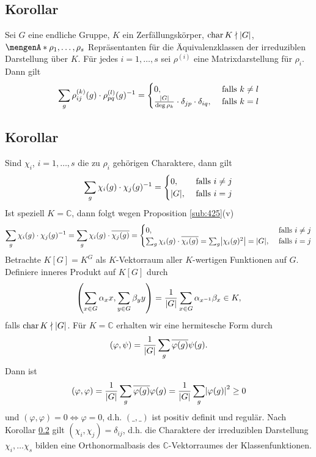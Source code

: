 \subsection{Korollar} %
\label{sub:428}
Sei $G$ eine endliche Gruppe, $K$ ein Zerfällungskörper, $\Char K  \nmid \abs*{G}$, $\set{\rho_1, \ldots , \rho_s}$ Repräsentanten für die Äquivalenzklassen der 
irreduziblen Darstellung über $K$. Für jedes $i=1, \ldots , s$ sei $\rho^{(i)}$ eine Matrixdarstellung für $\rho_i$. Dann gilt 
\[
	\sum_g \rho_{ij}^{(k)}(g) \cdot \rho_{pq}^{(l)}(g) ^{-1} = \begin{cases}
		0, &\text{ falls }k \not= l\\
		\frac{\abs*{G} }{\deg \rho_k} \cdot \delta_{jp} \cdot \delta_{iq} , &\text{ falls } k=l 
	\end{cases}
\]

\subsection{Korollar} %
\label{sub:429}
Sind $\chi_i$, $i=1, \ldots ,s$ die zu $\rho_i$ gehörigen Charaktere, dann gilt
\[
	\sum_g \chi_i(g) \cdot \chi_j(g) ^{-1} = \begin{cases}
		0, &\text{ falls }i \not= j\\
		\abs*{G}, &\text{ falls } i=j 
	\end{cases}
\]
Ist speziell $K=\mathds{C}$, dann folgt wegen Proposition \ref{sub:425}(v)
\[
	\sum_g \chi_i(g) \cdot \chi_j(g) ^{-1} = \sum_g \chi_i(g) \cdot \overline{\chi_j(g)} = \begin{cases}
		0, &\text{ falls }i \not= j\\
		\sum_g \chi_i(g) \cdot \overline{\chi_i(g)} = \sum_g \abs*{\chi_i(g)^2} = \abs*{G} , &\text{ falls } i=j   
	\end{cases}
\]
Betrachte $K[G]= K^G$ als $K$-Vektorraum aller $K$-wertigen Funktionen auf $G$. Definiere inneres Produkt auf $K[G]$ durch 
\[
	\enbrace*{\sum_{x \in G} \alpha_x x, \sum_{y \in G} \beta_y y} = \frac{1}{\abs*{G}} \sum_{x \in G} \alpha_{x ^{-1}} \beta_x \in K ,
\]
falls $\Char K \nmid \abs*{G}$. Für $K=\mathds{C}$ erhalten wir eine hermitesche Form durch
\[
	(\varphi, \psi) = \frac{1}{\abs*{G}}  \sum_g \overline{\varphi(g)} \psi(g) .
\]
Dann ist 
\begin{align*}
	(\varphi, \varphi) = \frac{1}{\abs*{G}} \sum_g \overline{\varphi(g)} \varphi(g) = \frac{1}{\abs*{G}} \sum_g \abs*{\varphi(g)}^2 \ge 0   
\end{align*}
und $(\varphi, \varphi)=0 \iff \varphi=0$, d.h. $(\_, \_)$ ist positiv definit und regulär. Nach Korollar \ref{sub:429} gilt $(\chi_i, \chi_j)= \delta_{ij}$, d.h. die
Charaktere der irreduziblen Darstellung $\chi_i , \ldots \chi_s$ bilden eine Orthonormalbasis des $\mathds{C}$-Vektorraumes der Klassenfunktionen.

